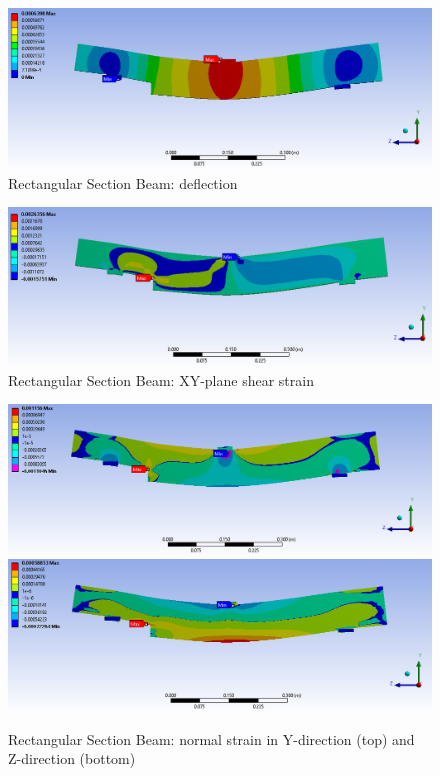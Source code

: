 \documentclass[11pt,a4paper]{article}
\numberwithin{equation}{subsection}
\begin{document}
\vspace*{\baselineskip}

\begin{figure}[h]
	\begin{center}
		\includegraphics[scale=0.45]{Ansys_Deflection}
	\end{center}
	
	\caption{Rectangular Section Beam: deflection}
	\label{fig:Def}
\end{figure}
\pagebreak
\begin{figure}[h]
	\begin{center}
		\includegraphics[scale=0.45]{YZ_shear_strain}
	\end{center}
	\caption{Rectangular Section Beam: XY-plane shear strain}
	\label{fig:yz_shear}
\end{figure}

\begin{figure}[h]
	\begin{center}
		\includegraphics[scale=0.45]{y_normal_strain}
		\includegraphics[scale=0.45]{z_normal_strain}
	\end{center}
	\caption{Rectangular Section Beam: normal strain in Y-direction (top) and Z-direction (bottom)}
	\label{fig:fig:y_norm}
\end{figure}
\end{document}

